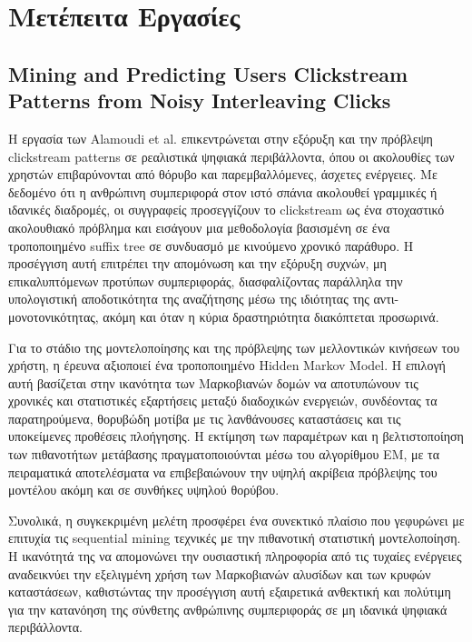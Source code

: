 \documentclass[12pt,a4paper]{article}
\begin{document}
	
	
	
	\section{Μετέπειτα Εργασίες}

	\subsection{Mining and Predicting Users Clickstream Patterns from Noisy Interleaving Clicks}
	
	Η εργασία των Alamoudi et al. \cite{clickstream2022} επικεντρώνεται στην εξόρυξη και την πρόβλεψη clickstream patterns σε ρεαλιστικά ψηφιακά περιβάλλοντα, όπου οι ακολουθίες των χρηστών επιβαρύνονται από θόρυβο και παρεμβαλλόμενες, άσχετες ενέργειες. Με δεδομένο ότι η ανθρώπινη συμπεριφορά στον ιστό σπάνια ακολουθεί γραμμικές ή ιδανικές διαδρομές, οι συγγραφείς προσεγγίζουν το clickstream ως ένα στοχαστικό ακολουθιακό πρόβλημα και εισάγουν μια μεθοδολογία βασισμένη σε ένα τροποποιημένο suffix tree σε συνδυασμό με κινούμενο χρονικό παράθυρο. Η προσέγγιση αυτή επιτρέπει την απομόνωση και την εξόρυξη συχνών, μη επικαλυπτόμενων προτύπων συμπεριφοράς, διασφαλίζοντας παράλληλα την υπολογιστική αποδοτικότητα της αναζήτησης μέσω της ιδιότητας της αντι-μονοτονικότητας, ακόμη και όταν η κύρια δραστηριότητα διακόπτεται προσωρινά.
	
	Για το στάδιο της μοντελοποίησης και της πρόβλεψης των μελλοντικών κινήσεων του χρήστη, η έρευνα αξιοποιεί ένα τροποποιημένο Hidden Markov Model. Η επιλογή αυτή βασίζεται στην ικανότητα των Μαρκοβιανών δομών να αποτυπώνουν τις χρονικές και στατιστικές εξαρτήσεις μεταξύ διαδοχικών ενεργειών, συνδέοντας τα παρατηρούμενα, θορυβώδη μοτίβα με τις λανθάνουσες καταστάσεις και τις υποκείμενες προθέσεις πλοήγησης. Η εκτίμηση των παραμέτρων και η βελτιστοποίηση των πιθανοτήτων μετάβασης πραγματοποιούνται μέσω του αλγορίθμου EM, με τα πειραματικά αποτελέσματα να επιβεβαιώνουν την υψηλή ακρίβεια πρόβλεψης του μοντέλου ακόμη και σε συνθήκες υψηλού θορύβου.
	
	Συνολικά, η συγκεκριμένη μελέτη προσφέρει ένα συνεκτικό πλαίσιο που γεφυρώνει με επιτυχία τις sequential mining τεχνικές με την πιθανοτική στατιστική μοντελοποίηση. Η ικανότητά της να απομονώνει την ουσιαστική πληροφορία από τις τυχαίες ενέργειες αναδεικνύει την εξελιγμένη χρήση των Μαρκοβιανών αλυσίδων και των κρυφών καταστάσεων, καθιστώντας την προσέγγιση αυτή εξαιρετικά ανθεκτική και πολύτιμη για την κατανόηση της σύνθετης ανθρώπινης συμπεριφοράς σε μη ιδανικά ψηφιακά περιβάλλοντα.
	
\end{document}
